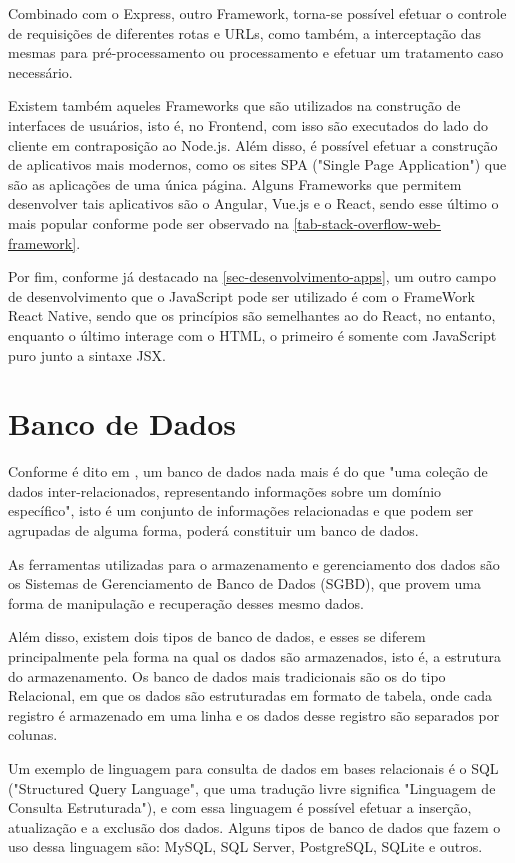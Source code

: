 Combinado com o Express, outro Framework, torna-se possível efetuar o controle de requisições de diferentes rotas e URLs, como também, a interceptação das mesmas para pré-processamento ou processamento e efetuar um tratamento caso necessário.

Existem também aqueles Frameworks que são utilizados na construção de interfaces de usuários, isto é, no Frontend, com isso são executados do lado do cliente em contraposição ao Node.js. Além disso, é possível efetuar a construção de aplicativos mais modernos, como os sites SPA ("Single Page Application") que são as aplicações de uma única página. Alguns Frameworks que permitem desenvolver tais aplicativos são o Angular, Vue.js e o React, sendo esse último o mais popular conforme pode ser observado na \autoref{tab-stack-overflow-web-framework}.

Por fim, conforme já destacado na \autoref{sec-desenvolvimento-apps}, um outro campo de desenvolvimento que o JavaScript pode ser utilizado é com o FrameWork React Native, sendo que os princípios são semelhantes ao do React, no entanto, enquanto o último interage com o HTML, o primeiro é somente com JavaScript puro junto a sintaxe JSX.

\section{Banco de Dados}

Conforme é dito em \cite{silberschatz2016sistema}, um banco de dados nada mais é do que "uma coleção de dados inter-relacionados, representando informações sobre um domínio específico", isto é um conjunto de informações relacionadas e que podem ser agrupadas de alguma forma, poderá constituir um banco de dados.

As ferramentas utilizadas para o armazenamento e gerenciamento dos dados são os Sistemas de Gerenciamento de Banco de Dados (SGBD), que provem uma forma de manipulação e recuperação desses mesmo dados.

Além disso, existem dois tipos de banco de dados, e esses se diferem principalmente pela forma na qual os dados são armazenados, isto é, a estrutura do armazenamento. Os banco de dados mais tradicionais são os do tipo Relacional, em que os dados são estruturadas em formato de tabela, onde cada registro é armazenado em uma linha e os dados desse registro são separados por colunas.

Um exemplo de linguagem para consulta de dados em bases relacionais é o SQL ("Structured Query Language", que uma tradução livre significa "Linguagem de Consulta Estruturada"), e com essa linguagem é possível efetuar a inserção, atualização e a exclusão dos dados. Alguns tipos de banco de dados que fazem o uso dessa linguagem são: MySQL, SQL Server, PostgreSQL, SQLite e outros.

